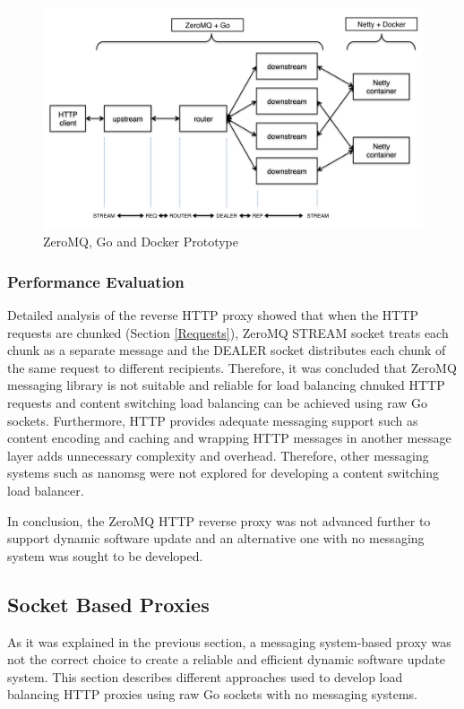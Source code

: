 \documentclass[a4paper,11pt,twoside]{article}
\begin{document}
\begin{figure}[!ht]
  \centering
     \includegraphics[scale=0.62]{prototype}
  \caption{ZeroMQ, Go and Docker Prototype}
  \label{prototype}
\end{figure}

\subsubsection{Performance Evaluation}
Detailed analysis of the reverse HTTP proxy showed that when the HTTP requests are chunked (Section \ref{Requests}), ZeroMQ STREAM socket treats each chunk as a separate message and the DEALER socket distributes each chunk of the same request to different recipients. Therefore, it was concluded that ZeroMQ messaging library is not suitable and reliable for load balancing chnuked HTTP requests and content switching load balancing can be achieved using raw Go sockets. Furthermore, HTTP provides adequate messaging support such as content encoding and caching and wrapping HTTP messages in another message layer adds unnecessary complexity and overhead. Therefore, other messaging systems such as nanomsg were not explored for developing a content switching load balancer. 

In conclusion, the ZeroMQ HTTP reverse proxy was not advanced further to support dynamic software update and an alternative one with no messaging system was sought to be developed. 

\subsection{Socket Based Proxies}
As it was explained in the previous section, a messaging system-based proxy was not the correct choice to create a reliable and efficient dynamic software update system. This section describes different approaches used to develop load balancing HTTP proxies using raw Go sockets with no messaging systems.   
\end{document}
